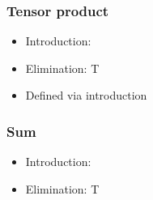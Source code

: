 \documentclass{beamer}
\begin{document}
  \begin{frame}
    \frametitle{Tensor product}
    \begin{itemize}
      \item Introduction:
                  {\ctx{\Gamma}{\Delta} \vdash {} \ni {}}
      \item Elimination:
                  {\ctx{\Gamma}{\Delta} \vdash {} \in T}
      \item Defined via introduction
    \end{itemize}
  \end{frame}
  \begin{frame}
    \frametitle{Sum}
    \begin{itemize}
      \item Introduction:
                  {\ctx{\Gamma}{\Delta} \vdash {} \ni {}}
      \item Elimination:
                  {\ctx{\Gamma}{\Delta} \vdash {} \in T}
    \end{itemize}
  \end{frame}
\end{document}
